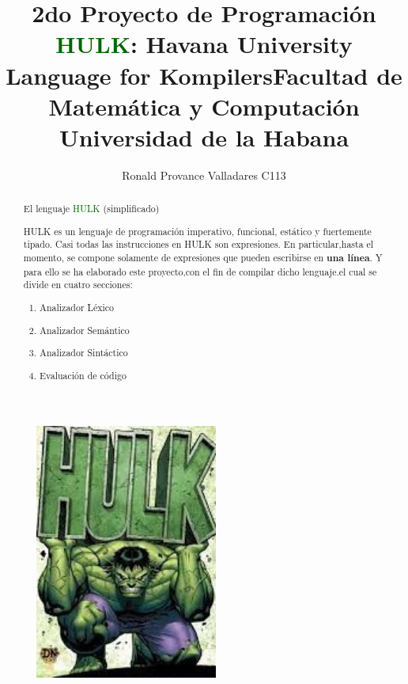 \documentclass[a4paper,12pt]{article}
\title{2do Proyecto de Programación \\ {\textcolor{darkgreen}{HULK}}: Havana University Language for Kompilers}
\author{Ronald Provance Valladares C113}
\date{}
\begin{document}
	\maketitle
	\begin{figure}[h]
		\centering
		\includegraphics[width=6cm]{icono.jpg}
	\end{figure}
	
	\begin{center}
		\Large\title{Facultad de Matemática y Computación }\\ 
	\Large\title{Universidad de la Habana}
	\end{center}
	
	
	\begin{abstract}
		
		\begin{center}
			\large El lenguaje {\textcolor{darkgreen}{HULK}} (simplificado)
		\end{center}
		
		\normalsize{HULK es un lenguaje de programación imperativo, funcional, estático y fuertemente tipado. Casi todas las instrucciones en HULK son expresiones. En particular,hasta el momento, se compone solamente de expresiones que pueden escribirse en \textbf{una línea}. Y para ello se ha elaborado este proyecto,con el fin de compilar dicho lenguaje.el cual se divide en cuatro secciones:}
		
		\begin{enumerate}
			\item Analizador Léxico      \item Analizador Semántico
			\item Analizador Sintáctico  \item Evaluación de código
		\end{enumerate}
		
	\end{abstract}
	
\end{document}
